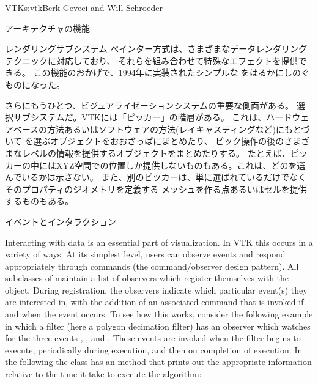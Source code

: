 \begin{aosachapter}{VTK}{s:vtk}{Berk Geveci and Will Schroeder}
\begin{aosasect1}{アーキテクチャの機能}
\begin{aosasect2}{レンダリングサブシステム}
ペインター方式は、さまざまなデータレンダリングテクニックに対応しており、
それらを組み合わせて特殊なエフェクトを提供できる。
この機能のおかげで、1994年に実装されたシンプルな
をはるかにしのぐものになった。

さらにもうひとつ、ビジュアライゼーションシステムの重要な側面がある。
選択サブシステムだ。VTKには「ピッカー」の階層がある。
これは、ハードウェアベースの方法あるいはソフトウェアの方法(レイキャスティングなど)にもとづいて
を選ぶオブジェクトをおおざっぱにまとめたり、
ピック操作の後のさまざまなレベルの情報を提供するオブジェクトをまとめたりする。
たとえば、ピッカーの中にはXYZ空間での位置しか提供しないものもある。これは、どのを選んでいるかは示さない。
また、別のピッカーは、単に選ばれているだけでなくそのプロパティのジオメトリを定義する
メッシュを作る点あるいはセルを提供するものもある。

\end{aosasect2}

\begin{aosasect2}{イベントとインタラクション}

Interacting with data is an essential part of visualization. In VTK
this occurs in a variety of ways. At its simplest level, users can
observe events and respond appropriately through commands (the
command/observer design pattern). All subclasses of 
maintain a list of observers which register themselves with the
object. During registration, the observers indicate which particular
event(s) they are interested in, with the addition of an associated
command that is invoked if and when the event occurs. To see how this
works, consider the following example in which a filter (here a
polygon decimation filter) has an observer which watches for the three
events , , and
. These events are invoked when the filter begins to
execute, periodically during execution, and then on completion of
execution. In the following the  class has an
 method that prints out the appropriate information
relative to the time it take to execute the algorithm:


\end{aosasect2}
\end{aosasect1}
\end{aosachapter}
